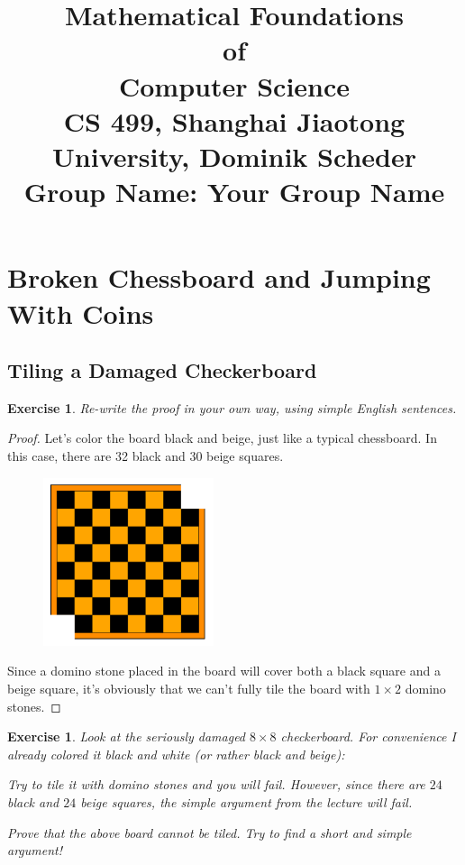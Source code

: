 \documentclass[12pt,a4]{article}
\date{}
\title{
	Mathematical Foundations \\of \\Computer Science\\
	\vspace{3mm}
	{\normalsize CS 499,	Shanghai Jiaotong University,  Dominik Scheder\\}
	{\normalsize Group Name: \textbf{Your Group Name}}
}
\theoremstyle{exercise}
\newtheorem{exercise}[theorem]{Exercise}
\begin{document}
\maketitle

\section{Broken Chessboard and Jumping With Coins}

\subsection{Tiling a Damaged Checkerboard}

\begin{exercise}
    Re-write the proof in your own way,  using simple English sentences.
\end{exercise}

\begin{proof}
	Let's color the board black and beige, just like a typical chessboard.
    In this case, there are 32 black and 30 beige squares.

    \begin{figure}[h]
        \small
        \centering
        \includegraphics[width=5cm]{slightlydamaged.png}
        \label{fig:slightlyDamagedBoard}
    \end{figure}

    Since a domino stone placed in the board will cover both a black square and a beige square,
    it's obviously that we can't fully tile the board with $1 \times 2$ domino stones.

\end{proof}

\begin{exercise}
    Look at the seriously damaged $8 \times 8$ checkerboard.
    For convenience I already colored it black and white (or rather black and beige):

    Try to tile it with domino stones and you will fail.
    However, since there are $24$ black and $24$ beige squares, the simple argument from the lecture will fail.

    Prove that the above board cannot be tiled. Try to ﬁnd a short and simple argument!
\end{exercise}
\end{document}
